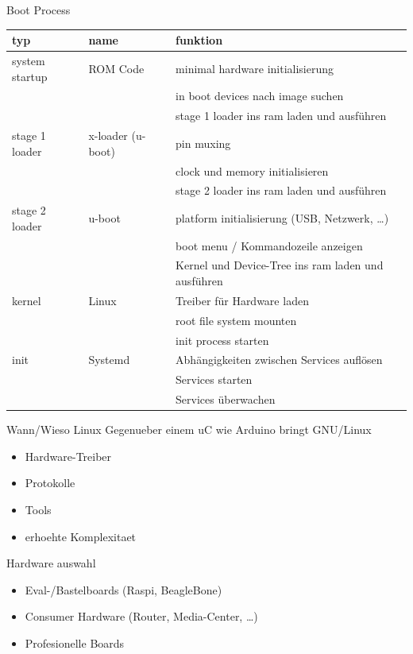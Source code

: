 

\begin{frame}{Boot Process \cite{OMAPBootloaderOverview}}
	\begin{tabular}{|l|l|l|}
		\hline typ & name & funktion \\ 
		\hline system startup & ROM Code & minimal hardware initialisierung \\ 
		& & in boot devices nach image suchen \\
		& & stage 1 loader ins ram laden und ausführen \\
		
		\hline stage 1 loader & x-loader (u-boot) & pin muxing \\ 
		& & clock und memory initialisieren \\
		& & stage 2 loader ins ram laden und ausführen \\
		
		\hline stage 2 loader & u-boot & platform initialisierung (USB, Netzwerk, \ldots) \\
		& & boot menu / Kommandozeile anzeigen \\
		& & Kernel und Device-Tree ins ram laden und ausführen \\
		
		\hline kernel & Linux & Treiber für Hardware laden \\ 
		& & root file system mounten \\
		& & init process starten \\
		
		\hline init & Systemd & Abhängigkeiten zwischen Services auflösen \\ 
		& & Services starten \\
		& & Services überwachen \\
		
		\hline 
	\end{tabular} 
\end{frame}


\begin{frame}{Wann/Wieso Linux}
	Gegenueber einem uC wie Arduino bringt GNU/Linux
	\begin{itemize}
		\item Hardware-Treiber
		\item Protokolle
		\item Tools
		\item erhoehte Komplexitaet
	\end{itemize}
\end{frame}

\begin{frame}{Hardware auswahl}
	\begin{itemize}
		\item Eval-/Bastelboards (Raspi, BeagleBone)
		\item Consumer Hardware (Router, Media-Center, \ldots)
		\item Profesionelle Boards
	\end{itemize}
\end{frame}


